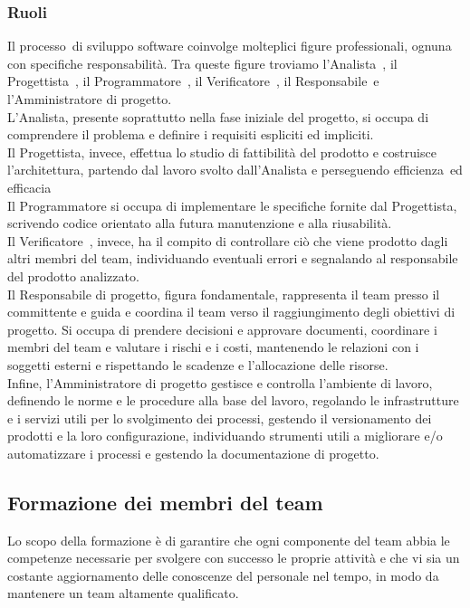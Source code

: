 \subsubsection{Ruoli}
Il processo\glo\ di sviluppo software coinvolge molteplici figure professionali, ognuna con specifiche responsabilità. Tra queste figure troviamo l'Analista\glo\ , il Progettista\glo\ , il Programmatore\glo\ , il Verificatore\glo\ , il Responsabile\glo\ e l'Amministratore di progetto. \\
L'Analista, presente soprattutto nella fase iniziale del progetto, si occupa di comprendere il problema e definire i requisiti espliciti ed impliciti. \\
Il Progettista, invece, effettua lo studio di fattibilità del prodotto e costruisce l'architettura, partendo dal lavoro svolto dall'Analista e perseguendo efficienza\glo\ ed efficacia\glo\. \\
Il Programmatore si occupa di implementare le specifiche fornite dal Progettista, scrivendo codice orientato alla futura manutenzione e alla riusabilità. \\
Il Verificatore\glo\ , invece, ha il compito di controllare ciò che viene prodotto dagli altri membri del team, individuando eventuali errori e segnalando al responsabile del prodotto analizzato. \\
Il Responsabile di progetto, figura fondamentale, rappresenta il team presso il committente e guida e coordina il team verso il raggiungimento degli obiettivi di progetto. Si occupa di prendere decisioni e approvare documenti, coordinare i membri del team e valutare i rischi e i costi, mantenendo le relazioni con i soggetti esterni e rispettando le scadenze e l'allocazione delle risorse. \\
Infine, l'Amministratore di progetto gestisce e controlla l'ambiente di lavoro, definendo le norme e le procedure alla base del lavoro, regolando le infrastrutture e i servizi utili per lo svolgimento dei processi, gestendo il versionamento dei prodotti e la loro configurazione, individuando strumenti utili a migliorare e/o automatizzare i processi e gestendo la documentazione di progetto. 

\subsection{Formazione dei membri del team}
Lo scopo della formazione è di garantire che ogni componente del team abbia le competenze necessarie per svolgere con successo le proprie attività e che vi sia un costante aggiornamento delle conoscenze del personale nel tempo, in modo da mantenere un team altamente qualificato.

